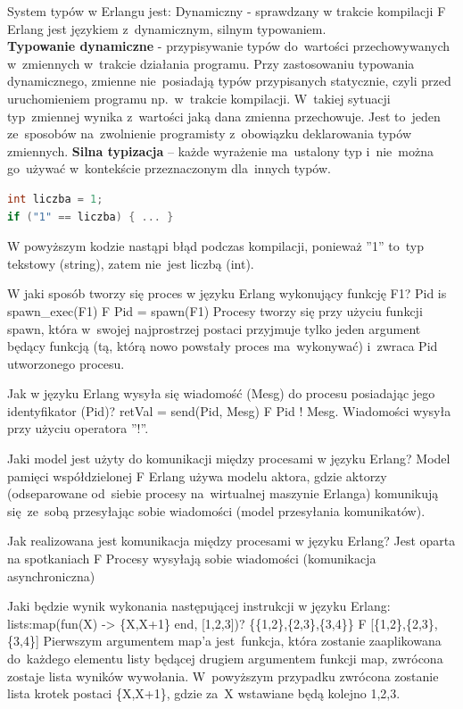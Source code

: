 \answerA
{System typów w Erlangu jest:}
{Dynamiczny - sprawdzany w trakcie kompilacji}
{F}
{Erlang jest językiem z~dynamicznym, silnym typowaniem.}
{\\}
\noindent
\textbf{Typowanie dynamiczne} - przypisywanie typów do~wartości przechowywanych w~zmiennych w~trakcie działania programu. Przy zastosowaniu typowania dynamicznego, zmienne nie~posiadają typów przypisanych statycznie, czyli przed uruchomieniem programu np.~w~trakcie kompilacji. W~takiej sytuacji typ~zmiennej wynika z~wartości jaką dana zmienna przechowuje. Jest to~jeden ze~sposobów na~zwolnienie programisty z~obowiązku deklarowania typów zmiennych.
\noindent
\textbf{Silna typizacja} – każde wyrażenie ma~ustalony typ i~nie~można go~używać w~kontekście przeznaczonym dla~innych typów.
\begin{lstlisting}[language=C]
int liczba = 1;
if ("1" == liczba) { ... }
\end{lstlisting}
W powyższym kodzie nastąpi błąd podczas kompilacji, ponieważ ''1'' to~typ tekstowy (string), zatem nie~jest liczbą (int).

\answerA
{W jaki sposób tworzy się proces w języku Erlang wykonujący funkcję F1?}
{Pid is spawn\_exec(F1)}
{F}
{Pid = spawn(F1)}
{Procesy tworzy się przy użyciu funkcji spawn, która w~swojej najprostrzej postaci przyjmuje tylko jeden argument będący funkcją (tą, którą nowo powstały proces ma~wykonywać) i~zwraca Pid utworzonego procesu.}

\answerA
{Jak w języku Erlang wysyła się wiadomość (Mesg) do procesu posiadając jego identyfikator (Pid)?}
{retVal = send(Pid, Mesg)}
{F}
{Pid ! Mesg.}
{Wiadomości wysyła przy użyciu operatora ''!''.}

\answerB
{Jaki model jest użyty do komunikacji między procesami w języku Erlang?}
{Model pamięci współdzielonej}
{F}
{Erlang używa modelu aktora, gdzie aktorzy (odseparowane od~siebie procesy na~wirtualnej maszynie Erlanga) komunikują się~ze~sobą przesyłając sobie wiadomości (model przesyłania komunikatów).}

\answerB
{Jak realizowana jest komunikacja między procesami w języku Erlang?}
{Jest oparta na spotkaniach}
{F}
{Procesy wysyłają sobie wiadomości (komunikacja asynchroniczna)}

\answerA
{Jaki będzie wynik wykonania następującej instrukcji w języku Erlang: lists:map(fun(X) -> \{X,X+1\} end, [1,2,3])?}
{\{\{1,2\},\{2,3\},\{3,4\}\}}
{F}
{[\{1,2\},\{2,3\},\{3,4\}]}
{Pierwszym argumentem map'a jest~funkcja, która zostanie zaaplikowana do~każdego elementu listy będącej drugiem argumentem funkcji map, zwrócona zostaje lista wyników wywołania. W~powyższym przypadku zwrócona zostanie lista krotek postaci \{X,X+1\}, gdzie za~X wstawiane będą kolejno 1,2,3.}

